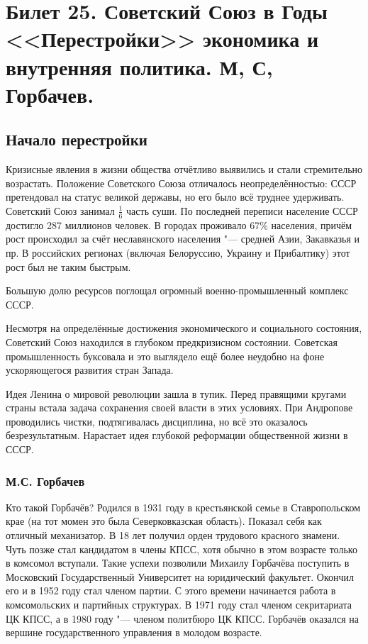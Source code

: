 \section{Билет 25. Советский Союз в Годы <<Перестройки>> экономика и внутренняя политика. М, С, Горбачев.}

\subsection{Начало перестройки}

Кризисные явления в жизни общества отчётливо выявились и стали стремительно возрастать. Положение Советского Союза отличалось неопределённостью: СССР претендовал на статус великой державы, но его было всё труднее удерживать. Советский Союз занимал $\frac{1}{6}$ часть суши. По последней переписи население СССР достигло 287 миллионов человек. В городах проживало 67\% населения, причём рост происходил за счёт неславянского населения "--- средней Азии, Закавказья и пр. В российских регионах (включая Белоруссию, Украину и Прибалтику) этот рост был не таким быстрым.

Большую долю ресурсов поглощал огромный военно-промышленный комплекс СССР.

Несмотря на определённые достижения экономического и социального состояния, Советский Союз находился в глубоком предкризисном состоянии. Советская промышленность буксовала и это выглядело ещё более неудобно на фоне ускоряющегося развития стран Запада.

Идея Ленина о мировой революции зашла в тупик. Перед правящими кругами страны встала задача сохранения своей власти в этих условиях. При Андропове проводились чистки, подтягивалась дисциплина, но всё это оказалось безрезультатным. Нарастает идея глубокой реформации общественной жизни в СССР.

\subsubsection{\textbf{М.С. Горбачев}}

Кто такой Горбачёв? Родился в 1931 году в крестьянской семье в Ставропольском крае (на тот момен это была Северковказская область). Показал себя как отличный механизатор. В 18 лет получил орден трудового красного знамени. Чуть позже стал кандидатом в члены КПСС, хотя обычно в этом возрасте только в комсомол вступали. Такие успехи позволили Михаилу Горбачёва поступить в Московский Государственный Университет на юридический факультет. Окончил его и в 1952 году стал членом партии. С этого времени начинается работа в комсомольских и партийных структурах. В 1971 году стал членом секритариата ЦК КПСС, а в 1980 году "--- членом политбюро ЦК КПСС. Горбачёв оказался на вершине государственного управления в молодом возрасте.

